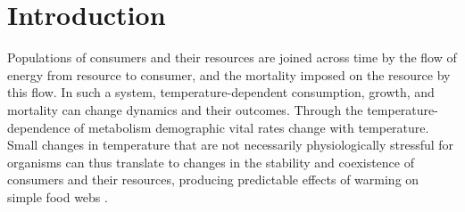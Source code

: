 \documentclass[11pt]{article}
\begin{document}
\newpage{}

\section*{Introduction}




%
%


Populations of consumers and their resources are joined across time by the flow of energy from resource to consumer, and the mortality imposed on the resource by this flow. 
In such a system, temperature-dependent consumption, growth, and mortality can change dynamics and their outcomes. 
Through the temperature-dependence of metabolism \citep{West1997,Gillooly2001} demographic vital rates change with temperature.
Small changes in temperature that are not necessarily physiologically stressful for organisms can thus translate to changes in the stability and coexistence of consumers and their resources,  producing predictable effects of warming on simple food webs \citep{Gilbert2014,Vasseur2005,OConnor2011,Rall2010}. 
\end{document}
